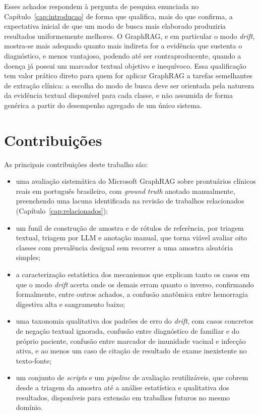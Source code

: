 Esses achados respondem à pergunta de pesquisa enunciada no Capítulo~\ref{cap:introducao} de forma que qualifica, mais do que confirma, a expectativa inicial de que um modo de busca mais elaborado produziria resultados uniformemente melhores. O GraphRAG, e em particular o modo \textit{drift}, mostra-se mais adequado quanto mais indireta for a evidência que sustenta o diagnóstico, e menos vantajoso, podendo até ser contraproducente, quando a doença já possui um marcador textual objetivo e inequívoco. Essa qualificação tem valor prático direto para quem for aplicar GraphRAG a tarefas semelhantes de extração clínica: a escolha do modo de busca deve ser orientada pela natureza da evidência textual disponível para cada classe, e não assumida de forma genérica a partir do desempenho agregado de um único sistema.

\section{Contribuições}\label{sec:conc-contribuicoes}

As principais contribuições deste trabalho são:

\begin{itemize}
    \item uma avaliação sistemática do Microsoft GraphRAG sobre prontuários clínicos reais em português brasileiro, com \textit{ground truth} anotado manualmente, preenchendo uma lacuna identificada na revisão de trabalhos relacionados (Capítulo~\ref{cap:relacionados});
    \item um funil de construção de amostra e de rótulos de referência, por triagem textual, triagem por LLM e anotação manual, que torna viável avaliar oito classes com prevalência desigual sem recorrer a uma amostra aleatória simples;
    \item a caracterização estatística dos mecanismos que explicam tanto os casos em que o modo \textit{drift} acerta onde os demais erram quanto o inverso, confirmando formalmente, entre outros achados, a confusão anatômica entre hemorragia digestiva alta e sangramento baixo;
    \item uma taxonomia qualitativa dos padrões de erro do \textit{drift}, com casos concretos de negação textual ignorada, confusão entre diagnóstico de familiar e do próprio paciente, confusão entre marcador de imunidade vacinal e infecção ativa, e ao menos um caso de citação de resultado de exame inexistente no texto-fonte;
    \item um conjunto de \textit{scripts} e um \textit{pipeline} de avaliação reutilizáveis, que cobrem desde a triagem da amostra até a análise estatística e qualitativa dos resultados, disponíveis para extensão em trabalhos futuros no mesmo domínio.
\end{itemize}

